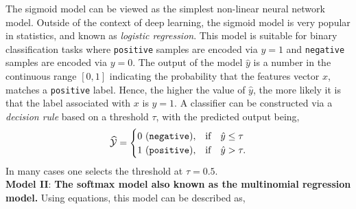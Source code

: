 \documentclass[12pt]{article}
\newcommand{\sbmc}[1]{{\color{cyan}#1}}
\begin{document}
The sigmoid model can be viewed as the simplest non-linear neural network model. %
Outside of the context of deep learning, the sigmoid model is very popular in statistics, and known as {\em logistic regression}. This model is suitable for binary classification tasks where \texttt{positive} samples are encoded via $y=1$ and \texttt{negative} samples are encoded via $y=0$.  The output of the model $\hat{y}$ is a number in the continuous range $[0,1]$ indicating the probability that the features vector $x$, matches a \texttt{positive} label. Hence, the higher the value of $\hat{y}$, the more likely it is that the label associated with $x$ is $y=1$. A classifier can be constructed via a \textit{decision rule} based on a threshold $\tau$, with the predicted output being,
%
\begin{equation} %
\label{eq:y-hat-tau}
\widehat{\cal Y} = 
\begin{cases}
0~ (\texttt{negative}), & \text{if} \quad  \hat{y} \le \tau \\
1~ (\texttt{positive}), & \text{if} \quad   \hat{y} > \tau.
\end{cases}
\end{equation}
In many cases one selects the threshold at $\tau = 0.5$. \\

\noindent
{\bf Model II}: {\bf The softmax model also known as the multinomial regression model.} Using equations, this model can be described as,
\end{document}
